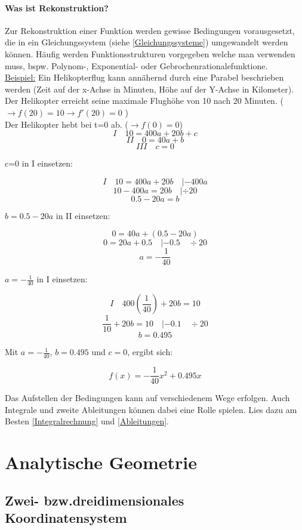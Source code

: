 \documentclass{article}
\begin{document}
		\paragraph{Was ist Rekonstruktion?}
			Zur Rekonstruktion einer Funktion werden gewisse Bedingungen vorausgesetzt, die in ein Gleichungssystem (siehe \ref{Gleichungssysteme}) umgewandelt werden können. Häufig werden Funktionsstrukturen vorgegeben welche man verwenden muss, bspw. Polynom-, Exponential- oder Gebrochenrationalefunktione. \\
			\underline{Beispiel:} Ein Helikopterflug kann annähernd durch eine Parabel beschrieben werden (Zeit auf der x-Achse in Minuten, Höhe auf der Y-Achse in Kilometer). \\
			Der Helikopter erreicht seine maximale Flughöhe von 10 nach 20 Minuten. ( $ \rightarrow f(20)=10 \rightarrow f'(20)=0 $ ) \\
			Der Helikopter hebt bei t=0 ab. ($ \rightarrow f(0)=0$) \\
			
			\[ I \quad 10=400a+20b+c \]
			\[ II \quad 0=40a+b \]
			\[ III \quad c=0 \]
			
			c=0 in I einsetzen:
			
			\[I \quad 10=400a+20b \quad |-400a \]
			\[ 10-400a=20b \quad | \div 20\]
			\[ 0.5-20a=b\]
			
			$b= 0.5-20a $ in II einsetzen:
			
			\[ 0=40a+(0.5-20a)\]
			\[ 0=20a+0.5 \quad |-0.5 \quad \div 20\]
			\[ a=-\frac{1}{40} \]
			
			$a=-\frac{1}{40}$ in I einsetzen:
			
			\[ I \quad 400(\frac{1}{40})+20b=10 \]
			\[ \frac{1}{10}+20b=10 \quad |-0.1 \quad \div 20\]
			\[ b=0.495\]
			
			Mit $a=-\frac{1}{40}$, $b=0.495$ und $c=0$, ergibt sich:
			
			\[f(x)=-\frac{1}{40}x^2+0.495x\]
			
			Das Aufstellen der Bedingungen kann auf verschiedenem Wege erfolgen. Auch Integrale und zweite Ableitungen können dabei eine Rolle spielen.
			Lies dazu am Besten \ref{Integralrechnung} und \ref{Ableitungen}.
		
\section{Analytische Geometrie}
\subsection{Zwei- bzw.dreidimensionales Koordinatensystem}
\end{document}
